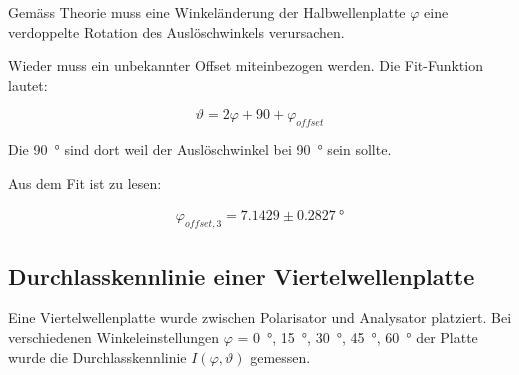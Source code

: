 Gem\"ass Theorie muss eine Winkel\"anderung der  Halbwellenplatte $\varphi$ eine
verdoppelte Rotation des Ausl\"oschwinkels verursachen.

Wieder muss ein unbekannter Offset miteinbezogen werden.  Die Fit-Funktion lautet:

\begin{equation}
    \vartheta = 2\varphi + 90 + \varphi_{offset}
\end{equation}

Die  \SI{90}{\degree}  sind dort weil der Ausl\"oschwinkel bei  \SI{90}{\degree}
sein sollte.

Aus dem Fit ist zu lesen:

\begin{align*}
    \varphi_{offset,3} = 7.1429 \pm 0.2827\SI{}{\degree}
\end{align*}


\subsection{Durchlasskennlinie einer Viertelwellenplatte}

Eine Viertelwellenplatte wurde  zwischen  Polarisator  und Analysator platziert.
Bei    verschiedenen    Winkeleinstellungen   $\varphi$    =    \SI{0}{\degree},
\SI{15}{\degree},  \SI{30}{\degree},  \SI{45}{\degree},   \SI{60}{\degree}   der
Platte   wurde   die   Durchlasskennlinie  $I(\varphi,   \vartheta)$   gemessen.

